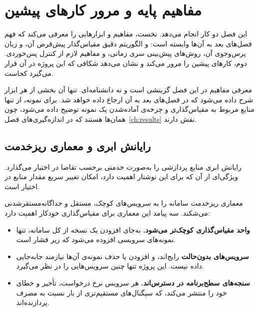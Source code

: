 \chapter{مفاهیم پایه و مرور کارهای پیشین}
\label{ch:background}

این فصل دو کار انجام می‌دهد. نخست، مفاهیم و ابزارهایی را معرفی می‌کند که فهم فصل‌های بعد به
آن‌ها وابسته است:  و الگوریتم دقیق مقیاس‌گذار پیش‌فرض آن،  و
زبان پرس‌وجوی آن، روش‌های پیش‌بینی سری زمانی، و مفاهیم لازم از کنترل پس‌خوردی. دوم، کارهای
پیشین را مرور می‌کند و نشان می‌دهد شکافی که این پروژه در آن قرار می‌گیرد کجاست.

معرفی مفاهیم در این فصل گزینشی است و نه دانشنامه‌ای. تنها آن بخشی از هر ابزار شرح داده می‌شود
که در فصل‌های بعد به آن ارجاع داده خواهد شد. برای نمونه، از  تنها منابع مربوط
به مقیاس‌گذاری و چرخه‌ی آماده‌شدن یک نمونه توضیح داده می‌شود، چون همان‌ها هستند که در
اندازه‌گیری‌های فصل~\ref{ch:results} نقش دارند.

\section{رایانش ابری و معماری ریزخدمت}
\label{sec:bg-cloud}

رایانش ابری منابع پردازشی را به‌صورت خدمتی برحسب تقاضا در اختیار می‌گذارد. ویژگی‌ای از آن که
برای این نوشتار اهمیت دارد، امکان تغییر سریع مقدار منابع در اختیار است.

معماری ریزخدمت سامانه را به سرویس‌های کوچک، مستقل و جداگانه‌مستقرشدنی می‌شکند. سه پیامد این
معماری برای مقیاس‌گذاری خودکار اهمیت دارد:

\begin{itemize}
  \item \textbf{واحد مقیاس‌گذاری کوچک‌تر می‌شود.} به‌جای افزودن یک نسخه از کل سامانه، تنها
  نمونه‌های سرویسی افزوده می‌شود که زیر فشار است.
  \item \textbf{سرویس‌های بدون‌حالت} رایج‌اند، و افزودن یا حذف
  نمونه‌ی آن‌ها نیازمند جابه‌جایی داده نیست. این پروژه تنها چنین سرویس‌هایی را در نظر می‌گیرد.
  \item \textbf{سنجه‌های سطح‌برنامه در دسترس‌اند.} هر سرویس نرخ درخواست، تأخیر و خطای خود را
  منتشر می‌کند، که سیگنال‌های مستقیم‌تری از بار نسبت به مصرف پردازنده‌اند.
\end{itemize}

\section{}
\label{sec:bg-k8s}

